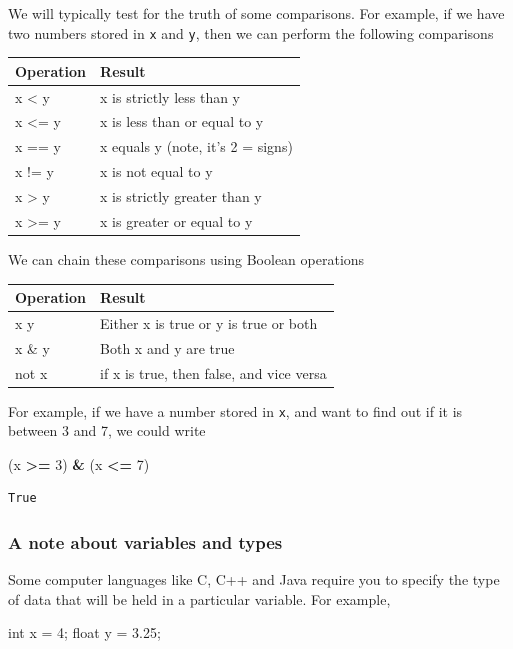 \documentclass[
  letterpaper,
]{scrbook}
\newenvironment{Shaded}{\begin{snugshade}}{\end{snugshade}}
\newcommand{\DataTypeTok}[1]{\textcolor[rgb]{0.13,0.29,0.53}{#1}}
\newcommand{\DecValTok}[1]{\textcolor[rgb]{0.00,0.00,0.81}{#1}}
\newcommand{\FloatTok}[1]{\textcolor[rgb]{0.00,0.00,0.81}{#1}}
\newcommand{\NormalTok}[1]{#1}
\newcommand{\OperatorTok}[1]{\textcolor[rgb]{0.81,0.36,0.00}{\textbf{#1}}}
\begin{document}
We will typically test for the truth of some comparisons. For example, if we have two numbers stored in \texttt{x} and \texttt{y}, then we can perform the following comparisons

\begin{longtable}[]{@{}ll@{}}
\toprule
Operation & Result\tabularnewline
\midrule
\endhead
x \textless{} y & x is strictly less than y\tabularnewline
x \textless= y & x is less than or equal to y\tabularnewline
x == y & x equals y (note, it's 2 = signs)\tabularnewline
x != y & x is not equal to y\tabularnewline
x \textgreater{} y & x is strictly greater than y\tabularnewline
x \textgreater= y & x is greater or equal to y\tabularnewline
\bottomrule
\end{longtable}

We can chain these comparisons using Boolean operations

\begin{longtable}[]{@{}ll@{}}
\toprule
Operation & Result\tabularnewline
\midrule
\endhead
x \textbar{} y & Either x is true or y is true or both\tabularnewline
x \& y & Both x and y are true\tabularnewline
not x & if x is true, then false, and vice versa\tabularnewline
\bottomrule
\end{longtable}

For example, if we have a number stored in \texttt{x}, and want to find out if it is between 3 and 7, we could write

\begin{Shaded}
\begin{Highlighting}[]
\NormalTok{(x }\OperatorTok{>=} \DecValTok{3}\NormalTok{) }\OperatorTok{&}\NormalTok{ (x }\OperatorTok{<=} \DecValTok{7}\NormalTok{)}
\end{Highlighting}
\end{Shaded}

\begin{verbatim}
True
\end{verbatim}

\hypertarget{a-note-about-variables-and-types}{%
\subsubsection{A note about variables and types}\label{a-note-about-variables-and-types}}

Some computer languages like C, C++ and Java require you to specify the type of data that will be held in a particular variable. For example,

\begin{Shaded}
\begin{Highlighting}[]
\DataTypeTok{int}\NormalTok{ x = }\DecValTok{4}\NormalTok{;}
\DataTypeTok{float}\NormalTok{ y = }\FloatTok{3.25}\NormalTok{;}
\end{Highlighting}
\end{Shaded}
\end{document}
